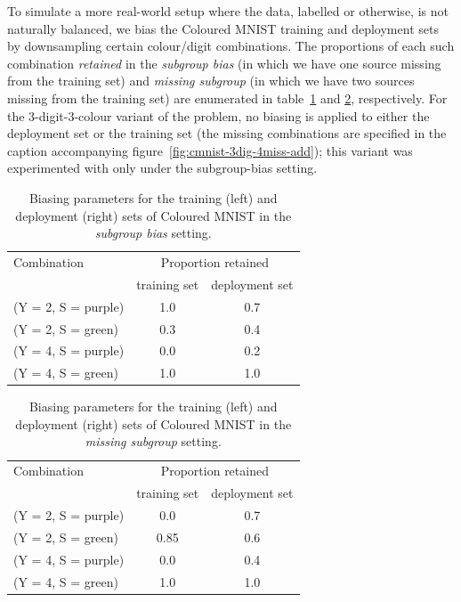 To simulate a more real-world setup where the data, labelled or otherwise, is not naturally
balanced, we bias the Coloured MNIST training and deployment sets by downsampling certain
colour/digit combinations. The proportions of each such combination \emph{retained} in the
\emph{subgroup bias} (in which we have one source missing from the training set) and \emph{missing
subgroup} (in which we have two sources missing from the training set) are enumerated in
table~\ref{color_mnist_biasing_po} and \ref{color_mnist_biasing_id}, respectively. For the
3-digit-3-colour variant of the problem, no biasing is applied to either the deployment set or the
training set (the missing combinations are specified in the caption accompanying
figure~\ref{fig:cmnist-3dig-4miss-add}); this variant was experimented with only under the
subgroup-bias setting.

\begin{table}[ht]
\caption{Biasing parameters for the training (left) and deployment (right) sets of Coloured MNIST in
the \emph{subgroup bias} setting.}
\label{color_mnist_biasing_po}
\centering
\begin{tabular}{lcc}
\toprule
Combination   & \multicolumn{2}{c}{Proportion retained} \\ \cmidrule(lr){2-3}
  & training set & deployment set \\ \midrule
(Y = 2, S = {\color{purple}purple}) & 1.0  & 0.7 \\
(Y = 2, S = {\color{green}green})   & 0.3  & 0.4 \\
(Y = 4, S = {\color{purple}purple}) & 0.0  & 0.2 \\
(Y = 4, S = {\color{green}green})   & 1.0  & 1.0 \\
\bottomrule
\end{tabular}
\end{table}

\begin{table}[ht]
\caption{Biasing parameters for the training (left) and deployment (right) sets of Coloured MNIST in
the \emph{missing subgroup} setting.}
\label{color_mnist_biasing_id}
\centering
\begin{tabular}{lcc}
\toprule
Combination   & \multicolumn{2}{c}{Proportion retained} \\ \cmidrule(lr){2-3}
  & training set & deployment set \\ \midrule
(Y = 2, S = {\color{purple}purple}) & 0.0  & 0.7 \\
(Y = 2, S = {\color{green}green})   & 0.85 & 0.6 \\
(Y = 4, S = {\color{purple}purple}) & 0.0  & 0.4 \\
(Y = 4, S = {\color{green}green})   & 1.0  & 1.0 \\
\bottomrule
\end{tabular}
\end{table}

